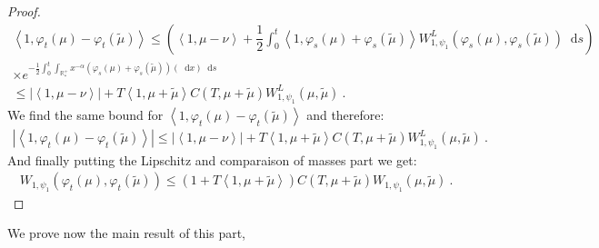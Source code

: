 \documentclass[11pt,a4paper]{article}
\newcommand{\RRP}{\mathbb{R}^+_*}
\newcommand{\brac}[1]{\left\langle#1\right\rangle}
\newcommand{\dd}{\mathop{}\!\mathrm{d}}
\begin{document}
\begin{proof}
\begin{multline*}
        \brac{1,\varphi_t(\mu)-\varphi_t(\tilde{\mu})} \leq \left(\brac{1,\mu-\nu} + \dfrac12\int_0^t \brac{1,\varphi_s(\mu)+\varphi_s(\tilde{\mu})} W_{1,\psi_1}^L\left(\varphi_s(\mu),\varphi_s(\tilde{\mu})\right) \dd s\right) \\
        \times e^{-\frac12\int_0^t \int_{\RRP} x^{-\alpha} \left(\varphi_s(\mu) + \varphi_s(\tilde{\mu})\right)(\dd x) \dd s}\\
        \leq \left| \brac{1,\mu-\nu}\right| + T\brac{1,\mu + \tilde{\mu}} C(T,\mu + \tilde{\mu})W_{1,\psi_1}^L\left(\mu,\tilde{\mu}\right)\ .
    \end{multline*}
    We find the same bound for $\brac{1,\varphi_t(\mu)-\varphi_t(\tilde{\mu})}$ and therefore:
    \begin{align*}
        \left|\brac{1,\varphi_t(\mu)-\varphi_t(\tilde{\mu})} \right| \leq \left| \brac{1,\mu-\nu}\right| + T\brac{1,\mu + \tilde{\mu}} C(T,\mu + \tilde{\mu})W_{1,\psi_1}^L\left(\mu,\tilde{\mu}\right)\ .
    \end{align*}
    And finally putting the Lipschitz and comparaison of masses part we get:
    \begin{align*}
        W_{1,\psi_1}(\varphi_t(\mu),\varphi_t(\tilde{\mu}))\leq \left( 1 + T\brac{1,\mu + \tilde{\mu}} \right) C(T,\mu + \tilde{\mu})W_{1,\psi_1}\left( \mu,\tilde{\mu}\right)\ .
    \end{align*}
\end{proof}

We prove now the main result of this part,
\end{document}
